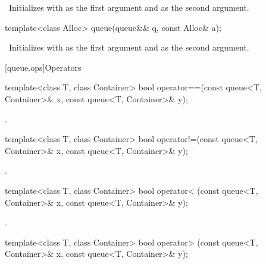 \begin{itemdescr}
\pnum
\effects\ Initializes  with  as the first argument and  as the
second argument.
\end{itemdescr}

\begin{itemdecl}
template<class Alloc> queue(queue&& q, const Alloc& a);
\end{itemdecl}

\begin{itemdescr}
\pnum
\effects\ Initializes  with  as the first argument and 
as the second argument.
\end{itemdescr}

[queue.ops]{Operators}

%
\begin{itemdecl}
template<class T, class Container>
  bool operator==(const queue<T, Container>& x, const queue<T, Container>& y);
\end{itemdecl}

\begin{itemdescr}
\pnum
\returns
{}.
\end{itemdescr}

%
\begin{itemdecl}
template<class T, class Container>
  bool operator!=(const queue<T, Container>& x,  const queue<T, Container>& y);
\end{itemdecl}

\begin{itemdescr}
\pnum
\returns
{}.
\end{itemdescr}

%
\begin{itemdecl}
template<class T, class Container>
  bool operator< (const queue<T, Container>& x, const queue<T, Container>& y);
\end{itemdecl}

\begin{itemdescr}
\pnum
\returns
{}.
\end{itemdescr}

%
\begin{itemdecl}
template<class T, class Container>
  bool operator> (const queue<T, Container>& x, const queue<T, Container>& y);
\end{itemdecl}

